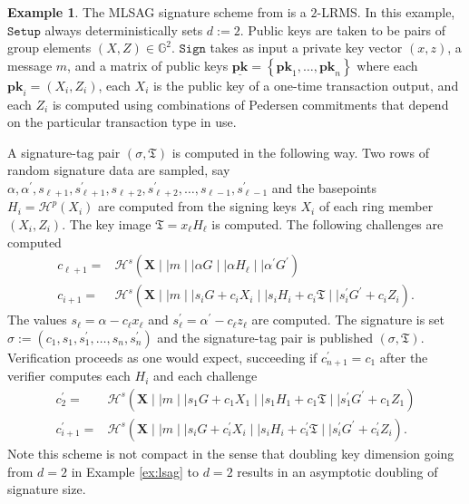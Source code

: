 \documentclass{article}
\theoremstyle{plain}
\theoremstyle{definition}
\newtheorem{example}{Example}[section]
\begin{document}
\begin{example}\label{ex:mlsag}
The MLSAG signature scheme from \cite{noether2016ring} is a $2$-LRMS. In this example, $\texttt{Setup}$ always deterministically sets $d := 2$. Public keys are taken to be pairs of group elements $(X, Z) \in \mathbb{G}^2$. $\texttt{Sign}$ takes as input a private key vector $(x,z)$, a message $m$, and a matrix of public keys $\underline{\textbf{pk}} = \left\{\textbf{pk}_1, \ldots, \textbf{pk}_n\right\}$ where each $\textbf{pk}_i = (X_i, Z_i)$, each $X_i$ is the public key of a one-time transaction output, and each $Z_i$ is computed using combinations of Pedersen commitments that depend on the particular transaction type in use. %

A signature-tag pair $(\sigma, \mathfrak{T})$ is computed in the following way. Two rows of random signature data are sampled, say  $\alpha, \alpha^\prime, s_{\ell + 1}, s^\prime_{\ell + 1}, s_{\ell + 2}, s^\prime_{\ell + 2}, \ldots, s_{\ell -1}, s^\prime_{\ell - 1}$  and the basepoints $H_i = \mathcal{H}^p(X_i)$ are computed from the signing keys $X_i$ of each ring member $(X_i, Z_i)$. The key image $\mathfrak{T} = x_\ell H_\ell$ is computed. The following  challenges are computed
\begin{align*}
c_{\ell + 1} =& \mathcal{H}^s(\textbf{X} \mid \mid m \mid \mid \alpha G \mid \mid \alpha H_\ell \mid \mid \alpha^\prime G^\prime) \\
c_{i+1} =& \mathcal{H}^s(\textbf{X} \mid \mid m \mid \mid s_i G + c_i X_i \mid \mid s_i H_i + c_i \mathfrak{T} \mid \mid s_i^\prime G^\prime + c_i Z_i). \end{align*}The values $s_\ell = \alpha - c_\ell x_\ell$ and $s_\ell^\prime = \alpha^\prime - c_\ell z_\ell$ are computed. The signature is set $\sigma := (c_1, s_1, s_1^\prime, \ldots, s_n, s_n^\prime)$ and the signature-tag pair is published $(\sigma, \mathfrak{T})$. Verification proceeds as one would expect, succeeding if $c_{n+1}^\prime = c_1$ after the verifier computes each $H_i$ and each challenge
\begin{align*}
c_{2}^\prime =&  \mathcal{H}^s(\textbf{X} \mid \mid m \mid \mid s_1 G + c_1 X_1 \mid \mid s_1 H_1 + c_1 \mathfrak{T} \mid \mid s_1^\prime G^\prime + c_1 Z_1) \\
c_{i+1}^\prime =&  \mathcal{H}^s\left(\textbf{X} \mid \mid m \mid \mid s_i G + c_i^\prime X_i \mid \mid s_i H_i + c_i^\prime \mathfrak{T} \mid \mid s_i^\prime G^\prime + c_i^\prime Z_i \right).
\end{align*} 
Note this scheme is not compact in the sense that doubling key dimension going from $d=2$ in Example \ref{ex:lsag} to $d=2$ results in an asymptotic doubling of signature size. 
\end{example}
\end{document}
